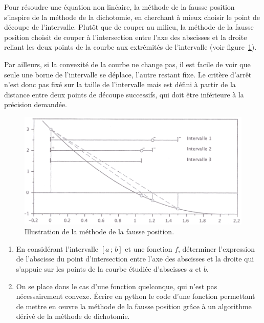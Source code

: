 Pour résoudre une équation non linéaire, la méthode de la fausse position s'inspire de la méthode de la dichotomie, en cherchant à mieux choisir le point de découpe de l'intervalle. Plutôt que de couper au milieu, la méthode de la fausse position choisit de couper à l'intersection entre l'axe des abscisses et la droite reliant les deux points de la courbe aux extrémités de l'intervalle (voir figure~\ref{fig:courbefausseposition}).

Par ailleurs, si la convexité de la courbe ne change pas, il est facile de voir que seule une borne de l'intervalle se déplace, l'autre restant fixe. Le critère d'arrêt n'est donc pas fixé sur la taille de l'intervalle mais est défini à partir de la distance entre deux points de découpe successifs, qui doit être inférieure à la précision demandée.

\begin{figure}[htp]
 \centering
 \includegraphics[width=\textwidth]{courbefausseposition}
 \caption{Illustration de la méthode de la fausse position.}
 \label{fig:courbefausseposition}
\end{figure}

\begin{enumerate}
 \item En considérant l'intervalle $[a\,;\,b]$ et une fonction $f$, déterminer l'expression de l'abscisse du point d'intersection entre l'axe des abscisses et la droite qui s'appuie sur les points de la courbe étudiée d'abscisses $a$ et $b$.
 
 \item On se place dans le cas d'une fonction quelconque, qui n'est pas nécessairement convexe. Écrire en python le code d'une fonction permettant de mettre en œuvre la méthode de la fausse position grâce à un algorithme dérivé de la méthode de dichotomie.
\end{enumerate}

